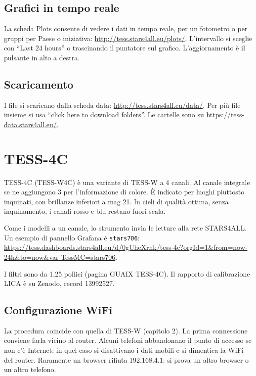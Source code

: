 \documentclass[11pt,a4paper]{report}
\begin{document}
\section{Grafici in tempo reale}

La scheda Plots consente di vedere i dati in tempo reale, per un fotometro o per gruppi per Paese o iniziativa: \url{http://tess.stars4all.eu/plots/}. L'intervallo si sceglie con ``Last 24 hours'' o trascinando il puntatore sul grafico. L'aggiornamento è il pulsante in alto a destra.

\section{Scaricamento}

I file si scaricano dalla scheda data: \url{http://tess.stars4all.eu/data/}. Per più file insieme si usa ``click here to download folders''. Le cartelle sono su \url{https://tess-data.stars4all.eu/}.

\chapter{TESS-4C}

TESS-4C (TESS-W4C) è una variante di TESS-W a 4 canali. Al canale integrale se ne aggiungono 3 per l'informazione di colore. È indicato per luoghi piuttosto inquinati, con brillanze inferiori a mag 21. In cieli di qualità ottima, senza inquinamento, i canali rosso e blu restano fuori scala.

Come i modelli a un canale, lo strumento invia le letture alla rete STARS4ALL. Un esempio di pannello Grafana è \texttt{stars706}:
\url{https://tess.dashboards.stars4all.eu/d/0gUheXrnk/tess-4c?orgId=1&from=now-24h&to=now&var-TessMC=stars706}.

I filtri sono da 1,25 pollici (pagina GUAIX TESS-4C). Il rapporto di calibrazione LICA è su Zenodo, record 13992527.

\section{Configurazione WiFi}

La procedura coincide con quella di TESS-W (capitolo 2). La prima connessione conviene farla vicino al router. Alcuni telefoni abbandonano il punto di accesso se non c'è Internet: in quel caso si disattivano i dati mobili e si dimentica la WiFi del router. Raramente un browser rifiuta 192.168.4.1: si prova un altro browser o un altro telefono.
\end{document}
